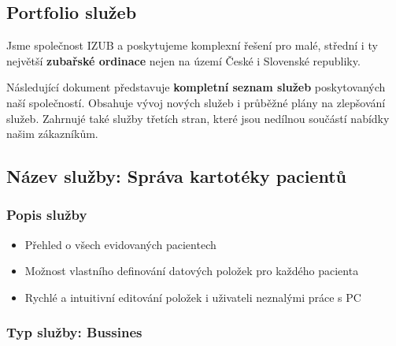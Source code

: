 \documentclass[11pt, a4paper, titlepage]{article}
\begin{document}
	
	\pagestyle{fancy}

	\begin{center}
		\section*{Portfolio služeb}
	\end{center}

	\noindent Jsme společnost IZUB a poskytujeme komplexní řešení pro malé, střední i ty největší \textbf{zubařské ordinace} nejen na území České i Slovenské republiky.

	\vspace{0.5em}

	\noindent Následující dokument představuje \textbf{kompletní seznam služeb} poskytovaných naší společností. Obsahuje vývoj nových služeb i průběžné plány na zlepšování služeb. Zahrnujé také služby třetích stran, které jsou nedílnou součástí nabídky našim zákazníkům. 

	\noindent\makebox[\linewidth]{\rule{17.5cm}{0.4pt}}

	\vspace {1.5em}

	\subsection*{Název služby: Správa kartotéky pacientů}

	\subsubsection*{Popis služby}
	\begin{itemize}
		\item Přehled o všech evidovaných pacientech
		\item Možnost vlastního definování datových položek pro každého pacienta
		\item Rychlé a intuitivní editování položek i uživateli neznalými práce s PC
	\end{itemize}

	\subsubsection*{Typ služby: Bussines}
\end{document}
